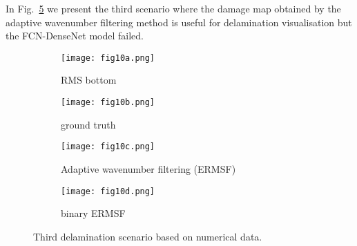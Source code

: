 
In Fig.~\ref{fig:RMS433} we present the third scenario where the damage map obtained by the adaptive wavenumber filtering method is useful for delamination visualisation but the FCN-DenseNet model failed.
\begin{figure}[!h]
	\centering
	\begin{subfigure}[b]{0.47\textwidth}
		\centering
		\texttt{[image: fig10a.png]}
		\caption{RMS bottom}
		\label{fig:RMS_flat_shell_Vz_433}
	\end{subfigure}
	\hfill
	\begin{subfigure}[b]{0.47\textwidth}
		\centering
		\texttt{[image: fig10b.png]}
		\caption{ground truth}
		\label{fig:m1_rand_single_delam_433}
	\end{subfigure}
	\hfill
	\begin{subfigure}[b]{0.47\textwidth}
		\centering
		\texttt{[image: fig10c.png]}
		\caption{Adaptive wavenumber filtering (ERMSF)}
		\label{fig:ERMSF_flat_shell_Vz_433}
	\end{subfigure}
	\hfill
	\begin{subfigure}[b]{0.47\textwidth}
		\centering
		\texttt{[image: fig10d.png]}
		\caption{binary ERMSF}
		\label{fig:Binary_ERMSF_flat_shell_Vz_433}
	\end{subfigure}
	\caption{Third delamination scenario based on numerical data.}
	\label{fig:RMS433}
\end{figure} 

